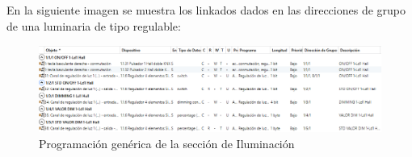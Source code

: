 En la siguiente imagen se muestra los linkados dados en las direcciones de grupo de una luminaria de tipo regulable:
 \begin{center}
\begin{figure}[H]
\includegraphics[width=1.15\textwidth]{figures/prog_dim.png}   
\caption{Programación genérica de la sección de Iluminación}
\label{fig:prog_dim}
\end{figure}
\end{center}

